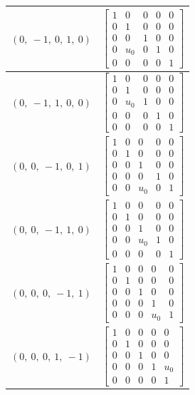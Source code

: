 \documentclass[11pt]{article}
\theoremstyle{definition}
\begin{document}
\begin{tabular}{|l|c|}
    \hline
    $\left( 0, \  -1, \  0, \  1, \  0\right)$ & $\left[\begin{matrix}1 & 0 & 0 & 0 & 0\\0 & 1 & 0 & 0 & 0\\0 & 0 & 1 & 0 & 0\\0 & u_{0} & 0 & 1 & 0\\0 & 0 & 0 & 0 & 1\end{matrix}\right]$ \\
    \hline
    $\left( 0, \  -1, \  1, \  0, \  0\right)$ & $\left[\begin{matrix}1 & 0 & 0 & 0 & 0\\0 & 1 & 0 & 0 & 0\\0 & u_{0} & 1 & 0 & 0\\0 & 0 & 0 & 1 & 0\\0 & 0 & 0 & 0 & 1\end{matrix}\right]$ \\
    \hline
    $\left( 0, \  0, \  -1, \  0, \  1\right)$ & $\left[\begin{matrix}1 & 0 & 0 & 0 & 0\\0 & 1 & 0 & 0 & 0\\0 & 0 & 1 & 0 & 0\\0 & 0 & 0 & 1 & 0\\0 & 0 & u_{0} & 0 & 1\end{matrix}\right]$ \\
    \hline
    $\left( 0, \  0, \  -1, \  1, \  0\right)$ & $\left[\begin{matrix}1 & 0 & 0 & 0 & 0\\0 & 1 & 0 & 0 & 0\\0 & 0 & 1 & 0 & 0\\0 & 0 & u_{0} & 1 & 0\\0 & 0 & 0 & 0 & 1\end{matrix}\right]$ \\
    \hline
    $\left( 0, \  0, \  0, \  -1, \  1\right)$ & $\left[\begin{matrix}1 & 0 & 0 & 0 & 0\\0 & 1 & 0 & 0 & 0\\0 & 0 & 1 & 0 & 0\\0 & 0 & 0 & 1 & 0\\0 & 0 & 0 & u_{0} & 1\end{matrix}\right]$ \\
    \hline
    $\left( 0, \  0, \  0, \  1, \  -1\right)$ & $\left[\begin{matrix}1 & 0 & 0 & 0 & 0\\0 & 1 & 0 & 0 & 0\\0 & 0 & 1 & 0 & 0\\0 & 0 & 0 & 1 & u_{0}\\0 & 0 & 0 & 0 & 1\end{matrix}\right]$ \\

\end{tabular}
\end{document}
